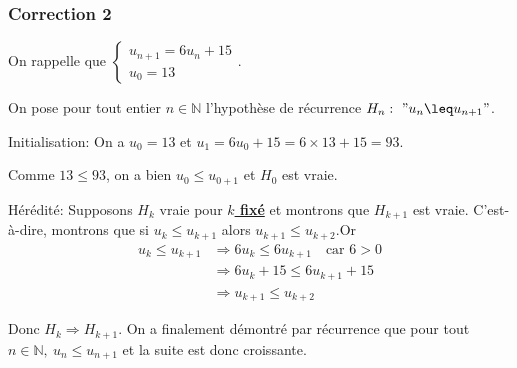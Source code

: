 \documentclass[15pt, mathserif]{beamer}
\begin{document}
\begin{frame}
\vspace{-10mm}
	\frametitle{Correction 2}
\vspace{6.5mm}

On rappelle que $\begin{cases} u_{n+1} = 6u_n+15\\ u_0 = 13\end{cases}$.

\medskip

 On pose pour tout entier $n \in \mathbb{N}$ l'hypothèse de récurrence $H_n:~"u_n  \leq u_{n+1}"$.

\medskip

Initialisation: On a $u_0 =13$ et $u_1 = 6u_0+15= 6\times13+15=93$.

 Comme $13 \leq 93$, on a bien $u_0  \leq u_{0+1}$ et $H_0$ est vraie.

\medskip

Hérédité: Supposons $H_k$ vraie pour \textbf\underline{{$k$ fixé}} et montrons que $H_{k+1}$ est vraie. C'est-à-dire, montrons que si $u_k  \leq u_{k+1}$ alors $u_{k+1}  \leq u_{k+2}$.Or \begin{align*} u_k  \leq u_{k+1} &\Rightarrow 6u_k \leq 6u_{k+1}\quad \text{car } 6>0\\
	 &\Rightarrow6u_k+15 \leq 6u_{k+1}+15\\
	 &\Rightarrow u_{k+1}  \leq u_{k+2}
\end{align*}

Donc $H_{k} \Rightarrow H_{k+1}$. On a finalement démontré par récurrence que pour tout $n \in\mathbb{N},~ u_n \leq u_{n+1}$ et la suite est donc croissante.\end{frame}
\end{document}
